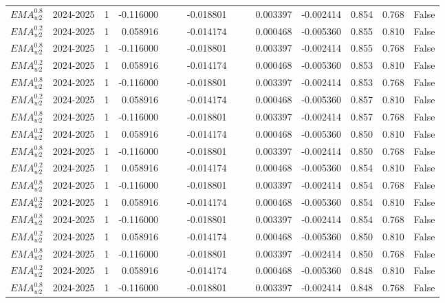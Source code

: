 \begin{tabular}{@{}llrrrrrrrrrlll@{}}
$EMA^{0.8}_{w2}$ & 2024-2025 & 1 & -0.116000 &  &  & -0.018801 &  &  & 0.003397 & -0.002414 & 0.854 & 0.768 & False \\
$EMA^{0.2}_{w2}$ & 2024-2025 & 1 & 0.058916 &  &  & -0.014174 &  &  & 0.000468 & -0.005360 & 0.855 & 0.810 & False \\
$EMA^{0.8}_{w2}$ & 2024-2025 & 1 & -0.116000 &  &  & -0.018801 &  &  & 0.003397 & -0.002414 & 0.855 & 0.768 & False \\
$EMA^{0.2}_{w2}$ & 2024-2025 & 1 & 0.058916 &  &  & -0.014174 &  &  & 0.000468 & -0.005360 & 0.853 & 0.810 & False \\
$EMA^{0.8}_{w2}$ & 2024-2025 & 1 & -0.116000 &  &  & -0.018801 &  &  & 0.003397 & -0.002414 & 0.853 & 0.768 & False \\
$EMA^{0.2}_{w2}$ & 2024-2025 & 1 & 0.058916 &  &  & -0.014174 &  &  & 0.000468 & -0.005360 & 0.857 & 0.810 & False \\
$EMA^{0.8}_{w2}$ & 2024-2025 & 1 & -0.116000 &  &  & -0.018801 &  &  & 0.003397 & -0.002414 & 0.857 & 0.768 & False \\
$EMA^{0.2}_{w2}$ & 2024-2025 & 1 & 0.058916 &  &  & -0.014174 &  &  & 0.000468 & -0.005360 & 0.850 & 0.810 & False \\
$EMA^{0.8}_{w2}$ & 2024-2025 & 1 & -0.116000 &  &  & -0.018801 &  &  & 0.003397 & -0.002414 & 0.850 & 0.768 & False \\
$EMA^{0.2}_{w2}$ & 2024-2025 & 1 & 0.058916 &  &  & -0.014174 &  &  & 0.000468 & -0.005360 & 0.854 & 0.810 & False \\
$EMA^{0.8}_{w2}$ & 2024-2025 & 1 & -0.116000 &  &  & -0.018801 &  &  & 0.003397 & -0.002414 & 0.854 & 0.768 & False \\
$EMA^{0.2}_{w2}$ & 2024-2025 & 1 & 0.058916 &  &  & -0.014174 &  &  & 0.000468 & -0.005360 & 0.854 & 0.810 & False \\
$EMA^{0.8}_{w2}$ & 2024-2025 & 1 & -0.116000 &  &  & -0.018801 &  &  & 0.003397 & -0.002414 & 0.854 & 0.768 & False \\
$EMA^{0.2}_{w2}$ & 2024-2025 & 1 & 0.058916 &  &  & -0.014174 &  &  & 0.000468 & -0.005360 & 0.850 & 0.810 & False \\
$EMA^{0.8}_{w2}$ & 2024-2025 & 1 & -0.116000 &  &  & -0.018801 &  &  & 0.003397 & -0.002414 & 0.850 & 0.768 & False \\
$EMA^{0.2}_{w2}$ & 2024-2025 & 1 & 0.058916 &  &  & -0.014174 &  &  & 0.000468 & -0.005360 & 0.848 & 0.810 & False \\
$EMA^{0.8}_{w2}$ & 2024-2025 & 1 & -0.116000 &  &  & -0.018801 &  &  & 0.003397 & -0.002414 & 0.848 & 0.768 & False \\

\end{tabular}
